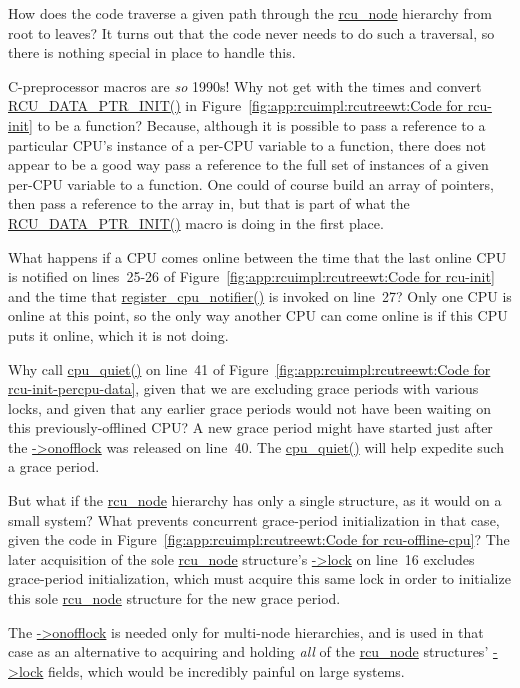 \QuickQ{}
	How does the code traverse a given path through
	the \url{rcu_node} hierarchy from root to leaves?
\QuickA{}
	It turns out that the code never needs to do such a traversal,
	so there is nothing special in place to handle this.

\QuickQ{}
	C-preprocessor macros are \emph{so} 1990s!
	Why not get with the times and convert \url{RCU_DATA_PTR_INIT()}
	in Figure~\ref{fig:app:rcuimpl:rcutreewt:Code for rcu-init}
	to be a function?
\QuickA{}
	Because, although it is possible to pass a reference to
	a particular CPU's instance of a per-CPU variable to a function,
	there does not appear to be a good way pass a reference to
	the full set of instances of a given per-CPU variable to
	a function.
	One could of course build an array of pointers, then pass a
	reference to the array in, but that is part of what
	the \url{RCU_DATA_PTR_INIT()} macro is doing in the first place.

\QuickQ{}
	What happens if a CPU comes online between the time
	that the last online CPU is notified on lines~25-26 of
	Figure~\ref{fig:app:rcuimpl:rcutreewt:Code for rcu-init}
	and the time that \url{register_cpu_notifier()} is invoked
	on line~27?
\QuickA{}
	Only one CPU is online at this point, so the only way another
	CPU can come online is if this CPU puts it online, which it
	is not doing.

\QuickQ{}
	Why call \url{cpu_quiet()} on line~41 of
	Figure~\ref{fig:app:rcuimpl:rcutreewt:Code for rcu-init-percpu-data},
	given that we are excluding grace periods with various
	locks, and given that any earlier grace periods would not have
	been waiting on this previously-offlined CPU?
\QuickA{}
	A new grace period might have started just after the
	\url{->onofflock} was released on line~40.
	The \url{cpu_quiet()} will help expedite such a grace period.

\QuickQ{}
	But what if the \url{rcu_node} hierarchy has only a single
	structure, as it would on a small system?
	What prevents concurrent grace-period initialization in that
	case, given the code in
	Figure~\ref{fig:app:rcuimpl:rcutreewt:Code for rcu-offline-cpu}?
\QuickA{}
	The later acquisition of the sole \url{rcu_node} structure's
	\url{->lock} on line~16 excludes grace-period initialization,
	which must acquire this same lock in order to initialize this
	sole \url{rcu_node} structure for the new grace period.

	The \url{->onofflock} is needed only for multi-node hierarchies,
	and is used in that case as an alternative to acquiring and
	holding \emph{all} of the \url{rcu_node} structures'
	\url{->lock} fields, which would be incredibly painful on
	large systems.

